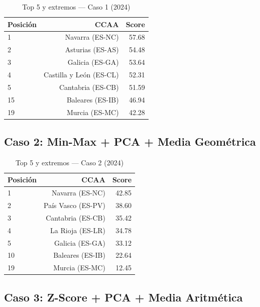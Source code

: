 \begin{table}[H]
    \centering
    \small
    \begin{tabular}{lrr}
        \toprule
        \textbf{Posición} & \textbf{CCAA} & \textbf{Score} \\
        \midrule
        1 & Navarra (ES-NC) & 57.68 \\
        2 & Asturias (ES-AS) & 54.48 \\
        3 & Galicia (ES-GA) & 53.64 \\
        4 & Castilla y León (ES-CL) & 52.31 \\
        5 & Cantabria (ES-CB) & 51.59 \\
        \midrule
        15 & Baleares (ES-IB) & 46.94 \\
        19 & Murcia (ES-MC) & 42.28 \\
        \bottomrule
    \end{tabular}
    \caption{Top 5 y extremos — Caso 1 (2024)}
    \label{tab:caso1_2024}
\end{table}

\subsection{Caso 2: Min-Max + PCA + Media Geométrica}

\begin{table}[H]
    \centering
    \small
    \begin{tabular}{lrr}
        \toprule
        \textbf{Posición} & \textbf{CCAA} & \textbf{Score} \\
        \midrule
        1 & Navarra (ES-NC) & 42.85 \\
        2 & País Vasco (ES-PV) & 38.60 \\
        3 & Cantabria (ES-CB) & 35.42 \\
        4 & La Rioja (ES-LR) & 34.78 \\
        5 & Galicia (ES-GA) & 33.12 \\
        \midrule
        10 & Baleares (ES-IB) & 22.64 \\
        19 & Murcia (ES-MC) & 12.45 \\
        \bottomrule
    \end{tabular}
    \caption{Top 5 y extremos — Caso 2 (2024)}
    \label{tab:caso2_2024}
\end{table}

\subsection{Caso 3: Z-Score + PCA + Media Aritmética}

